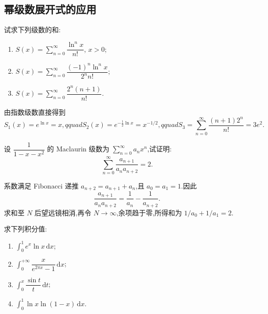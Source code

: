 \subsection{幂级数展开式的应用}



\begin{example}
    试求下列级数的和:
    \begin{enumerate}
        \item $\displaystyle S(x)=\sum\limits_{n=0}^{\infty}\dfrac{\ln^n x}{n!}$, $x>0$;
        \item $\displaystyle S(x)=\sum\limits_{n=0}^{\infty}\dfrac{(-1)^n\ln^n x}{2^n n!}$;
        \item $\displaystyle S(x)=\sum\limits_{n=0}^{\infty}\dfrac{2^n(n+1)}{n!}$.
    \end{enumerate}
\end{example}
\exampleblank

\begin{solution}
    由指数级数直接得到
    \[
        S_1(x)=e^{\ln x}=x,qquad
        S_2(x)=e^{-\frac{1}{2}\ln x}=x^{-1/2},qquad
        S_3=\sum\limits_{n=0}^{\infty}\dfrac{(n+1)2^n}{n!}=3e^2.
    \]
\end{solution}

\begin{example}
    设 $\dfrac{1}{1-x-x^2}$ 的 Maclaurin 级数为 $\displaystyle\sum\limits_{n=0}^{\infty}a_nx^n$,试证明:
    \[
        \displaystyle\sum\limits_{n=0}^{\infty}\dfrac{a_{n+1}}{a_na_{n+2}}=2.
    \]
\end{example}
\exampleblank

\begin{solution}
    系数满足 Fibonacci 递推 $a_{n+2}=a_{n+1}+a_n$,且 $a_0=a_1=1$.因此
    \[
        \dfrac{a_{n+1}}{a_na_{n+2}}
        =\dfrac{1}{a_n}-\dfrac{1}{a_{n+2}}.
    \]
    求和至 $N$ 后望远镜相消,再令 $N\to\infty$,余项趋于零,所得和为
    $1/a_0+1/a_1=2$.
\end{solution}




\begin{example}
    求下列积分值:
    \begin{enumerate}
        \item $\displaystyle\int_0^1e^x\ln x\,\mathrm{d}x$;
        \item $\displaystyle\int_0^{+\infty}\dfrac{x}{e^{2\pi x}-1}\,\mathrm{d}x$;
        \item $\displaystyle\int_0^x\dfrac{\sin t}{t}\,\mathrm{d}t$;
        \item $\displaystyle\int_0^1\ln x\ln(1-x)\,\mathrm{d}x$.
    \end{enumerate}
\end{example}
\exampleblank


